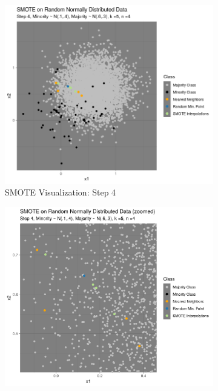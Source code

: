 \documentclass[12pt,a4paper]{article}
\begin{document}
\begin{figure}[] %
\begin{subfigure}{0.48\textwidth}
\includegraphics[width=\linewidth]{./graphics/knn004.png}
\caption{SMOTE Visualization: Step 4} \label{fig:a}
\end{subfigure}\hspace*{\fill}
\begin{subfigure}{0.48\textwidth}
\includegraphics[width=\linewidth]{./graphics/knn_zoom004.png}

\end{subfigure}
\end{figure}
\end{document}
